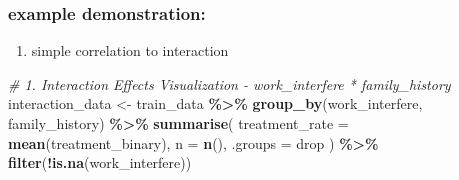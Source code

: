 \documentclass[
]{article}
\newenvironment{Shaded}{\begin{snugshade}}{\end{snugshade}}
\newcommand{\AttributeTok}[1]{\textcolor[rgb]{0.13,0.29,0.53}{#1}}
\newcommand{\CommentTok}[1]{\textcolor[rgb]{0.56,0.35,0.01}{\textit{#1}}}
\newcommand{\FunctionTok}[1]{\textcolor[rgb]{0.13,0.29,0.53}{\textbf{#1}}}
\newcommand{\NormalTok}[1]{#1}
\newcommand{\OtherTok}[1]{\textcolor[rgb]{0.56,0.35,0.01}{#1}}
\newcommand{\SpecialCharTok}[1]{\textcolor[rgb]{0.81,0.36,0.00}{\textbf{#1}}}
\newcommand{\StringTok}[1]{\textcolor[rgb]{0.31,0.60,0.02}{#1}}
\providecommand{\tightlist}{%
  \setlength{\itemsep}{0pt}\setlength{\parskip}{0pt}}
\begin{document}
\subsubsection{example demonstration:}\label{example-demonstration}

\begin{enumerate}
\def\labelenumi{\arabic{enumi}.}
\tightlist
\item
  simple correlation to interaction
\end{enumerate}

\begin{Shaded}
\begin{Highlighting}[]
\CommentTok{\# 1. Interaction Effects Visualization {-} work\_interfere * family\_history}
\NormalTok{interaction\_data }\OtherTok{\textless{}{-}}\NormalTok{ train\_data }\SpecialCharTok{\%\textgreater{}\%}
  \FunctionTok{group\_by}\NormalTok{(work\_interfere, family\_history) }\SpecialCharTok{\%\textgreater{}\%}
  \FunctionTok{summarise}\NormalTok{(}
    \AttributeTok{treatment\_rate =} \FunctionTok{mean}\NormalTok{(treatment\_binary),}
    \AttributeTok{n =} \FunctionTok{n}\NormalTok{(),}
    \AttributeTok{.groups =} \StringTok{\textquotesingle{}drop\textquotesingle{}}
\NormalTok{  ) }\SpecialCharTok{\%\textgreater{}\%}
  \FunctionTok{filter}\NormalTok{(}\SpecialCharTok{!}\FunctionTok{is.na}\NormalTok{(work\_interfere))}


\end{Highlighting}
\end{Shaded}
\end{document}
